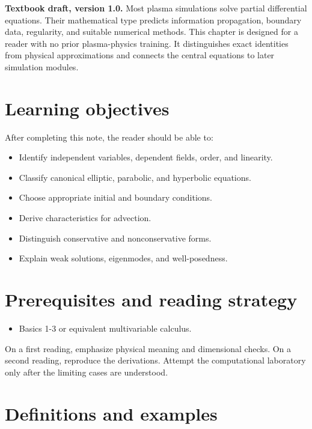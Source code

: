\documentclass[11pt]{article}
\begin{document}

\begin{overviewbox}
\textbf{Textbook draft, version 1.0.} Most plasma simulations solve partial differential equations. Their mathematical type predicts information propagation, boundary data, regularity, and suitable numerical methods. This chapter is designed for a reader with no prior plasma-physics training. It distinguishes exact identities from physical approximations and connects the central equations to later simulation modules.
\end{overviewbox}

\ProjectTOC

\section{Learning objectives}
After completing this note, the reader should be able to:
\begin{itemize}[leftmargin=1.6em]
\item Identify independent variables, dependent fields, order, and linearity.
\item Classify canonical elliptic, parabolic, and hyperbolic equations.
\item Choose appropriate initial and boundary conditions.
\item Derive characteristics for advection.
\item Distinguish conservative and nonconservative forms.
\item Explain weak solutions, eigenmodes, and well-posedness.
\end{itemize}

\section{Prerequisites and reading strategy}
\begin{itemize}[leftmargin=1.6em]
\item Basics 1-3 or equivalent multivariable calculus.
\end{itemize}
On a first reading, emphasize physical meaning and dimensional checks. On a second reading, reproduce the derivations. Attempt the computational laboratory only after the limiting cases are understood.

\section{Definitions and examples}
\end{document}
